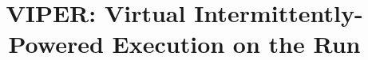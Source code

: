 \documentclass[pageno]{jpaper}
\newcommand{\sysfull}{VIPER: Virtual Intermittently-Powered Execution on the Run}
\begin{document}
\title{\sysfull}









\date{}
\maketitle

\thispagestyle{empty}

\begin{abstract}
	


\end{abstract}

\end{document}
